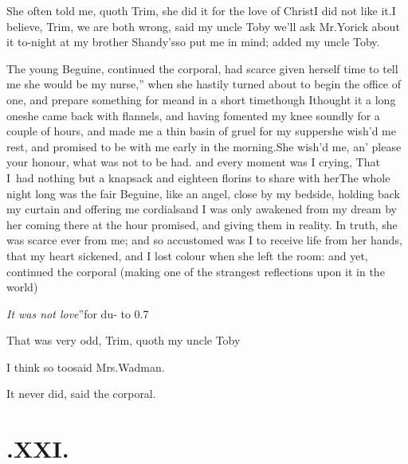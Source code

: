 \documentclass[twoside]{article}
\begin{document}
\tsh She often told me, quoth Trim, she did
it for the love of Christ\tsk I did not
like it.\tsh I believe, Trim, we are both
wrong, said my uncle Toby\tsk
we’ll ask Mr.\@ Yorick about it
to-night at my brother Shandy’s\tsh so put
me in mind; added my uncle Toby.

The young Beguine, continued the corporal, had scarce
given herself time to tell me \lqq she would be my nurse,”\break
when she hastily turned about to begin the office of one, and
prepare something for me\tsh and in a short
time\tsk though I\break thought it a long one\tsk she came back with
flannels, \etc \etc and having fomented my knee soundly for a
couple of hours, \etc and made me a thin basin of gruel for my
supper\tsk she wish’d me rest, and promised to be with me
early in the morning.\tsh She wish’d me, an’
please your honour, what was not to be had.
and every moment was I crying, That I~had nothing but a
knapsack and eight\-een florins to share with her\tsh The
whole night long was the fair Beguine, like an angel, close
by my bedside, holding back my curtain and offering me
cordials\tsk and I was only awakened from my dream by her coming
there at the hour promised, and giving them in
re\-ality. In truth,
she was scarce ever from me; and so accustomed was I to receive
life from her hands, that my heart sickened, and I lost colour when
she left the room: and yet, continued the corporal 
(making one of the strangest reflections upon it in
the world)\tsh

\tsh \lqq\textit{It was not love}”\tsh for du-\break
{}
\hbox to 0.7

That was very odd, Trim, quoth my uncle Toby\tsh

I think so too\tsk said Mrs.\@ Wadman.

It never did, said the corporal.

\vfill{}\eject\null
\section{.\enspace XXI.}
\end{document}
